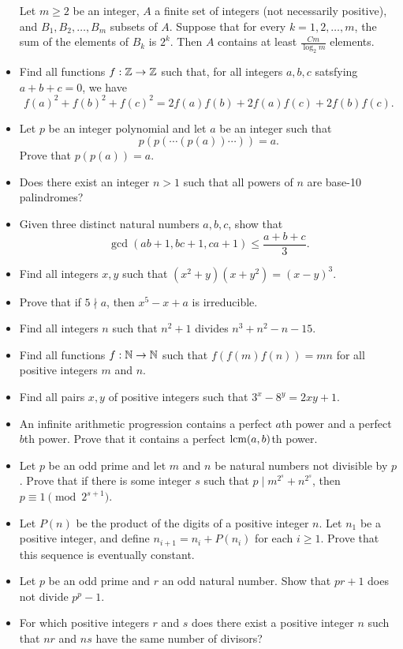 \begin{itemize}
    Let $m\ge 2$ be an integer, $A$ a finite set of integers (not
    necessarily positive), and $B_1,B_2,\ldots,B_m$ subsets of $A$. Suppose
    that for every $k=1,2,\ldots,m$, the sum of the elements of $B_k$ is
    $2^k$. Then $A$ contains at least $\frac {Cm}{\log_2 m}$ elements.
  \item Find all functions $f:\mathbb{Z}\to\mathbb{Z}$ such that, for all integers $a,b,c$
    satsfying $a+b+c=0$, we have
    \[f(a)^2+f(b)^2+f(c)^2=2f(a)f(b)+2f(a)f(c)+2f(b)f(c).\]
  \item Let $p$ be an integer polynomial and let $a$ be an integer such that
      \[
          p(p(\cdots(p(a))\cdots))=a.
      \]
      Prove that $p(p(a))=a$.
  \item Does there exist an integer $n>1$ such that all powers of $n$ are
    base-10 palindromes?
    \item Given three distinct natural numbers $a,b,c$, show that
      \[\gcd(ab+1,bc+1,ca+1)\le\frac{a+b+c}3.\]
  \item Find all integers $x,y$ such that $(x^2+y)(x+y^2)=(x-y)^3$.
  \item Prove that if $5\nmid a$, then $x^5-x+a$ is irreducible.
    \item Find all integers $n$ such that $n^2+1$ divides $n^3+n^2-n-15$.
  \item Find all functions $f:\mathbb{N}\to\mathbb{N}$ such that $f(f(m)f(n))=mn$ for all
    positive integers $m$ and $n$.
  \item Find all pairs $x,y$ of positive integers such that $3^x-8^y=2xy+1$.
  \item An infinite arithmetic progression contains a perfect $a$th power and a
    perfect $b$th power. Prove that it contains a perfect $\mathrm{lcm}(a,b)$th power.
  \item Let $p$ be an odd prime and let $m$ and $n$ be natural numbers not
    divisible by $p$. Prove that if there is some integer $s$ such that $p\mid
    m^{2^s}+n^{2^s}$, then $p\equiv 1\pmod{2^{s+1}}$.
  \item Let $P(n)$ be the product of the digits of a positive integer $n$.
    Let $n_1$ be a positive integer, and define $n_{i+1}=n_i+P(n_i)$ for each
    $i\ge 1$. Prove that this sequence is eventually constant.
  \item Let $p$ be an odd prime and $r$ an odd natural number. Show that $pr+1$
    does not divide $p^p-1$.
  \item For which positive integers $r$ and $s$ does there exist a positive
    integer $n$ such that $nr$ and $ns$ have the same number of divisors?

\end{itemize}
